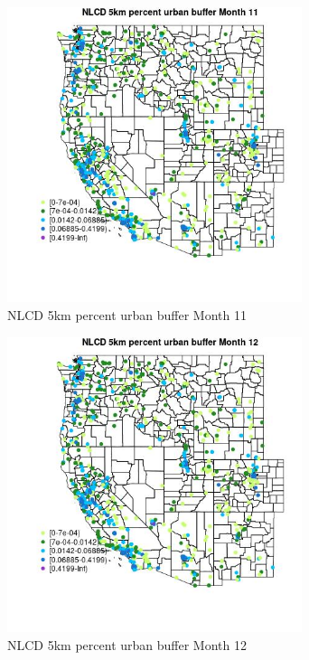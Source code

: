 \begin{figure} 
\centering  
\includegraphics[width=0.77\textwidth]{Code_Outputs/Report_ML_input_PM25_Step4_part_f_de_duplicated_aves_prioritize_24hr_obswNAs_MapObsMo11NLCD_5km_percent_urban_buffer.jpg} 
\caption{\label{fig:Report_ML_input_PM25_Step4_part_f_de_duplicated_aves_prioritize_24hr_obswNAsMapObsMo11NLCD_5km_percent_urban_buffer}NLCD 5km percent urban buffer Month 11} 
\end{figure} 
 

\clearpage 

\begin{figure} 
\centering  
\includegraphics[width=0.77\textwidth]{Code_Outputs/Report_ML_input_PM25_Step4_part_f_de_duplicated_aves_prioritize_24hr_obswNAs_MapObsMo12NLCD_5km_percent_urban_buffer.jpg} 
\caption{\label{fig:Report_ML_input_PM25_Step4_part_f_de_duplicated_aves_prioritize_24hr_obswNAsMapObsMo12NLCD_5km_percent_urban_buffer}NLCD 5km percent urban buffer Month 12} 
\end{figure} 
 

